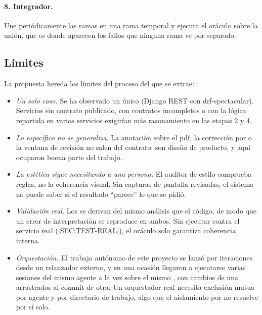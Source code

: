 \paragraph{8. Integrador.} Une periódicamente las ramas en una rama temporal y ejecuta el
oráculo sobre la unión, que es donde aparecen los fallos que ninguna rama ve por separado.

\subsection{Límites}

La propuesta hereda los límites del proceso del que se extrae:
\begin{itemize}
  \item \emph{Un solo caso.} Se ha observado un único  (Django REST con
        drf-spectacular). Servicios sin contrato publicado, con contratos incompletos o con
        la lógica repartida en varios servicios exigirían más razonamiento en las etapas 2 y 4.
  \item \emph{Lo específico no se generaliza.} La anotación sobre el \acs{pdf}, la
        corrección por  o la ventana de revisión no salen del contrato: son
        diseño de producto, y aquí ocuparon buena parte del trabajo.
  \item \emph{La estética sigue necesitando a una persona.} El auditor de estilo comprueba
        reglas, no la coherencia visual. Sin capturas de pantalla revisadas, el sistema no
        puede saber si el resultado ``parece'' lo que se pidió.
  \item \emph{Validación real.} Los  se derivan del mismo análisis que el
        código, de modo que un error de interpretación se reproduce en ambos. Sin ejecutar
        contra el servicio real (\cref{SEC:TEST-REAL}), el oráculo solo garantiza coherencia
        interna.
  \item \emph{Orquestación.} El trabajo autónomo de este proyecto se lanzó por iteraciones
        desde un relanzador externo, y en una ocasión llegaron a ejecutarse varias sesiones
        del mismo agente a la vez sobre el mismo , con cambios de una
        arrastrados al commit de otra. Un orquestador real necesita exclusión mutua por
        agente y por directorio de trabajo, algo que el aislamiento por  no
        resuelve por sí solo.
\end{itemize}

